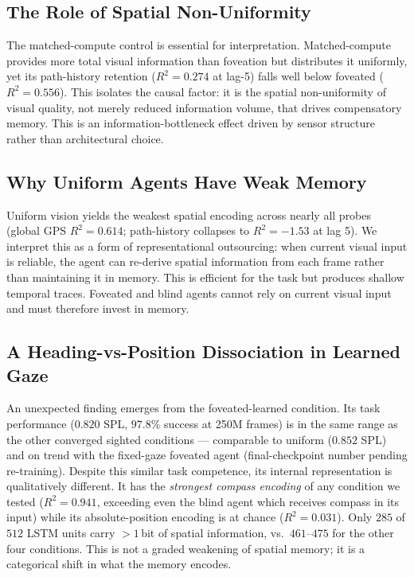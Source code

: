 \documentclass[10pt,conference,compsocconf]{IEEEtran}
\begin{document}
\subsection{The Role of Spatial Non-Uniformity}

The matched-compute control is essential for interpretation. Matched-compute provides more total visual information than foveation but distributes it uniformly, yet its path-history retention ($R^2=0.274$ at lag-5) falls well below foveated ($R^2=0.556$). This isolates the causal factor: it is the spatial non-uniformity of visual quality, not merely reduced information volume, that drives compensatory memory. This is an information-bottleneck effect driven by sensor structure rather than architectural choice.

\subsection{Why Uniform Agents Have Weak Memory}

Uniform vision yields the weakest spatial encoding across nearly all probes (global GPS $R^2 = 0.614$; path-history collapses to $R^2 = -1.53$ at lag 5). We interpret this as a form of representational outsourcing: when current visual input is reliable, the agent can re-derive spatial information from each frame rather than maintaining it in memory. This is efficient for the task but produces shallow temporal traces. Foveated and blind agents cannot rely on current visual input and must therefore invest in memory.

\subsection{A Heading-vs-Position Dissociation in Learned Gaze}

An unexpected finding emerges from the foveated-learned condition. Its task performance ($0.820$ SPL, $97.8\%$ success at 250M frames) is in the same range as the other converged sighted conditions --- comparable to uniform ($0.852$ SPL) and on trend with the fixed-gaze foveated agent (final-checkpoint number pending re-training). Despite this similar task competence, its internal representation is qualitatively different. It has the \emph{strongest compass encoding} of any condition we tested ($R^2=0.941$, exceeding even the blind agent which receives compass in its input) while its absolute-position encoding is at chance ($R^2=0.031$). Only $285$ of $512$ LSTM units carry $>1$\,bit of spatial information, vs.\ $461$--$475$ for the other four conditions. This is not a graded weakening of spatial memory; it is a categorical shift in what the memory encodes.
\end{document}
